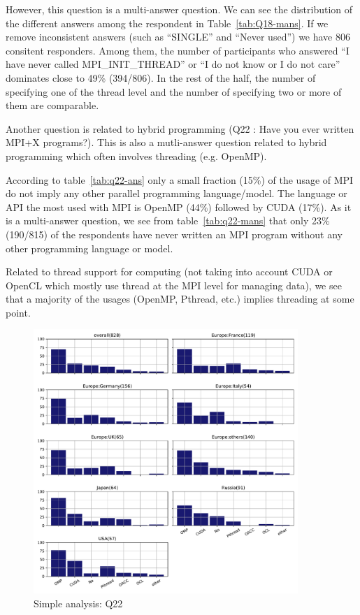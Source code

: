 However, this question is a multi-answer question. We can see the distribution
of the different answers among the respondent in Table~\ref{tab:Q18-mans}. If we
remove inconsistent answers (such as ``SINGLE'' and ``Never used'') we  have 806
consitent responders. Among them, the 
number of participants who answered ``I have never called
MPI\_INIT\_THREAD'' or ``I do not know or I do not care'' dominates
close to 49\% (394/806).  In the rest of the half, the
number of specifying one of the thread level and the number of
specifying two or more of them are comparable. 





Another question is related to hybrid programming (Q22 : Have you ever written
MPI+X programs?).  This is also a mutli-answer question related to hybrid
programming which often involves threading (e.g. OpenMP). 




According to table~\ref{tab:q22-ans} only a small fraction (15\%) of the usage
of  MPI do not imply  any other parallel programming language/model. The language
or API the most used with MPI is OpenMP (44\%) followed by CUDA
(17\%). As it is a multi-answer question, we see from table~\ref{tab:q22-mans}
that  only 23\% (190/815) of the respondents have never written an MPI program
without any other programming language or model. 



Related to thread support for computing (not taking into account CUDA or
OpenCL which mostly use thread at the MPI level for managing data), we see that a
majority of the usages (OpenMP, Pthread, etc.)  implies threading at some point.


\begin{figure}[htb]
\begin{center}
\includegraphics[width=10cm]{../pdfs/Q22.pdf}
\caption{Simple analysis: Q22}
\label{fig:Q22}
\end{center}
\end{figure}

